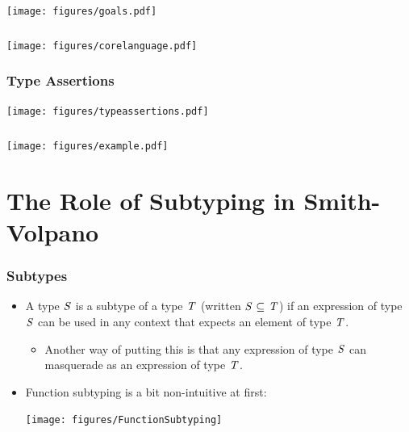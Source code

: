 \documentclass{beamer}
\begin{document}
\begin{frame}[fragile]
\frametitle{}
\begin{center}
\texttt{[image: figures/goals.pdf]}
\end{center}
\end{frame}

\begin{frame}[fragile]
\frametitle{}
\begin{center}
\texttt{[image: figures/corelanguage.pdf]}
\end{center}
\end{frame}

\begin{frame}[fragile]
\frametitle{Type Assertions}
\begin{center}
\texttt{[image: figures/typeassertions.pdf]}
\end{center}
\end{frame}

\begin{frame}[fragile]
\frametitle{}
\begin{center}
\texttt{[image: figures/example.pdf]}
\end{center}
\end{frame}

\section{The Role of Subtyping in Smith-Volpano}

\begin{frame}
\frametitle{Subtypes}

\begin{itemize}
\item A type ${\it {S}}$ is a subtype of a type ${\it {T}}$ (written ${\it {S
{\rm \ \subseteq \ }T}}$) if an expression of type ${\it {S}}$ can be used in any context that expects an element of type ${\it {T}}$. 
\begin{itemize}
\item Another way of putting this is that any expression of type ${\it {S}}$ can masquerade as an expression of type ${\it {T}}$. 
\end{itemize}
\pause

\item Function subtyping is a bit non-intuitive at first:
\begin{center}
\texttt{[image: figures/FunctionSubtyping]}
\end{center}

\end{itemize}

\end{frame}
\end{document}
